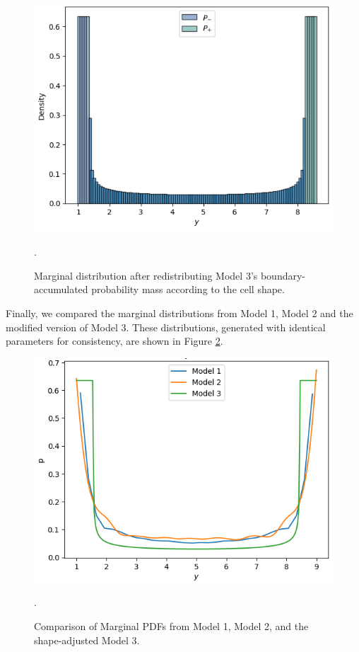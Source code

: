 \begin{figure}[htbp]
    \centering
    \includegraphics[scale=0.4]{graphics/model_3_with_shape_hist.png}
    \caption{Marginal distribution after redistributing Model 3's boundary-accumulated probability mass according to the cell
    shape.}
    \label{fig:model_3_modified_hist}. 
\end{figure}

Finally, we compared the marginal distributions from Model 1, Model 2 and the modified version of Model 3.
These distributions, generated with identical parameters for consistency, are shown in 
Figure \ref{fig:model_comparisons}.

\begin{figure}[htbp]
    \centering
    \includegraphics[scale=0.4]{graphics/model_comparisons.png}
    \caption{Comparison of Marginal PDFs from Model 1, Model 2, and the shape-adjusted Model 3.}
    \label{fig:model_comparisons}. 
\end{figure}

